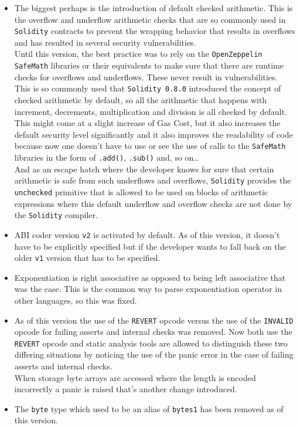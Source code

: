 \begin{itemize}
\item
  The biggest perhaps is the introduction of default checked arithmetic.
  This is the overflow and underflow arithmetic checks that are so
  commonly used in \texttt{Solidity} contracts to prevent the wrapping
  behavior that results in overflows and has resulted in several
  security vulnerabilities.\\

  Until this version, the best practice was to rely on the
  \texttt{OpenZeppelin} \texttt{SafeMath} libraries or their equivalents
  to make sure that there are runtime checks for overflows and
  underflows. These never result in vulnerabilities. This is so commonly
  used that \texttt{Solidity\ 0.8.0} introduced the concept of checked
  arithmetic by default, so all the arithmetic that happens with
  increment, decrements, multiplication and division is all checked by
  default.\\

  This might come at a slight increase of Gas Cost, but it also
  increases the default security level significantly and it also
  improves the readability of code because now one doesn't have to use
  or see the use of calls to the \texttt{SafeMath} libraries in the form
  of \texttt{.add()}, \texttt{.sub()} and, so on\ldots{}\\

  And as an escape hatch where the developer knows for sure that certain
  arithmetic is safe from such underflows and overflows,
  \texttt{Solidity} provides the \texttt{unchecked} primitive that is
  allowed to be used on blocks of arithmetic expressions where this
  default underflow and overflow checks are not done by the
  \texttt{Solidity} compiler.\\
\item
  ABI coder version \texttt{v2} is activated by default. As of this
  version, it doesn't have to be explicitly specified but if the
  developer wants to fall back on the older \texttt{v1} version that has
  to be specified.
\item
  Exponentiation is right associative as opposed to being left
  associative that was the case. This is the common way to parse
  exponentiation operator in other languages, so this was fixed.
\item
  As of this version the use of the \texttt{REVERT} opcode versus the
  use of the \texttt{INVALID} opcode for failing asserts and internal
  checks was removed. Now both use the \texttt{REVERT} opcode and static
  analysis tools are allowed to distinguish these two differing
  situations by noticing the use of the panic error in the case of
  failing asserts and internal checks.\\

  When storage byte arrays are accessed where the length is encoded
  incorrectly a panic is raised that's another change introduced.
\item
  The \texttt{byte} type which used to be an alias of \texttt{bytes1}
  has been removed as of this version.
\end{itemize}

